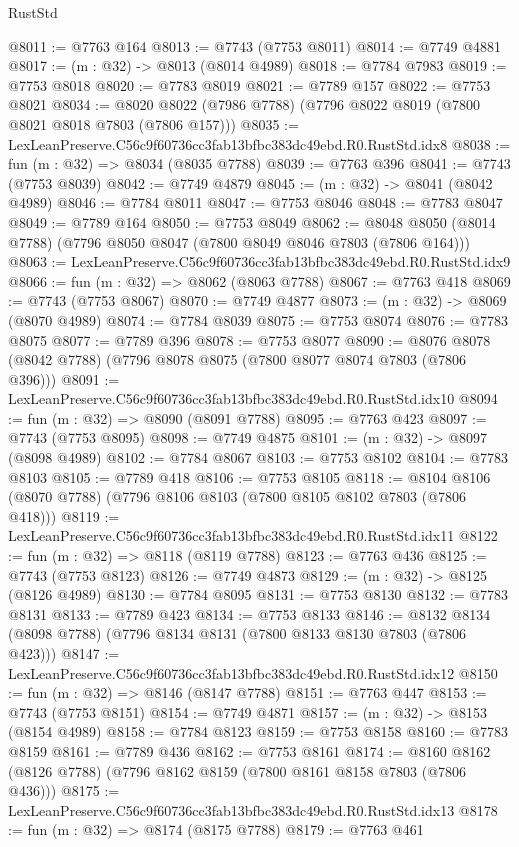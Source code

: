 \begin{lexlean}{RustStd}
\begin{coremodule}
@8011 := @7763 @164
@8013 := @7743 (@7753 @8011)
@8014 := @7749 @4881
@8017 := (m : @32) -> @8013 (@8014 @4989)
@8018 := @7784 @7983
@8019 := @7753 @8018
@8020 := @7783 @8019
@8021 := @7789 @157
@8022 := @7753 @8021
@8034 := @8020 @8022 (@7986 @7788) (@7796 @8022 @8019 (@7800 @8021 @8018 @7803 (@7806 @157)))
@8035 := LexLeanPreserve.C56c9f60736cc3fab13bfbc383dc49ebd.R0.RustStd.idx8
@8038 := fun (m : @32) => @8034 (@8035 @7788)
@8039 := @7763 @396
@8041 := @7743 (@7753 @8039)
@8042 := @7749 @4879
@8045 := (m : @32) -> @8041 (@8042 @4989)
@8046 := @7784 @8011
@8047 := @7753 @8046
@8048 := @7783 @8047
@8049 := @7789 @164
@8050 := @7753 @8049
@8062 := @8048 @8050 (@8014 @7788) (@7796 @8050 @8047 (@7800 @8049 @8046 @7803 (@7806 @164)))
@8063 := LexLeanPreserve.C56c9f60736cc3fab13bfbc383dc49ebd.R0.RustStd.idx9
@8066 := fun (m : @32) => @8062 (@8063 @7788)
@8067 := @7763 @418
@8069 := @7743 (@7753 @8067)
@8070 := @7749 @4877
@8073 := (m : @32) -> @8069 (@8070 @4989)
@8074 := @7784 @8039
@8075 := @7753 @8074
@8076 := @7783 @8075
@8077 := @7789 @396
@8078 := @7753 @8077
@8090 := @8076 @8078 (@8042 @7788) (@7796 @8078 @8075 (@7800 @8077 @8074 @7803 (@7806 @396)))
@8091 := LexLeanPreserve.C56c9f60736cc3fab13bfbc383dc49ebd.R0.RustStd.idx10
@8094 := fun (m : @32) => @8090 (@8091 @7788)
@8095 := @7763 @423
@8097 := @7743 (@7753 @8095)
@8098 := @7749 @4875
@8101 := (m : @32) -> @8097 (@8098 @4989)
@8102 := @7784 @8067
@8103 := @7753 @8102
@8104 := @7783 @8103
@8105 := @7789 @418
@8106 := @7753 @8105
@8118 := @8104 @8106 (@8070 @7788) (@7796 @8106 @8103 (@7800 @8105 @8102 @7803 (@7806 @418)))
@8119 := LexLeanPreserve.C56c9f60736cc3fab13bfbc383dc49ebd.R0.RustStd.idx11
@8122 := fun (m : @32) => @8118 (@8119 @7788)
@8123 := @7763 @436
@8125 := @7743 (@7753 @8123)
@8126 := @7749 @4873
@8129 := (m : @32) -> @8125 (@8126 @4989)
@8130 := @7784 @8095
@8131 := @7753 @8130
@8132 := @7783 @8131
@8133 := @7789 @423
@8134 := @7753 @8133
@8146 := @8132 @8134 (@8098 @7788) (@7796 @8134 @8131 (@7800 @8133 @8130 @7803 (@7806 @423)))
@8147 := LexLeanPreserve.C56c9f60736cc3fab13bfbc383dc49ebd.R0.RustStd.idx12
@8150 := fun (m : @32) => @8146 (@8147 @7788)
@8151 := @7763 @447
@8153 := @7743 (@7753 @8151)
@8154 := @7749 @4871
@8157 := (m : @32) -> @8153 (@8154 @4989)
@8158 := @7784 @8123
@8159 := @7753 @8158
@8160 := @7783 @8159
@8161 := @7789 @436
@8162 := @7753 @8161
@8174 := @8160 @8162 (@8126 @7788) (@7796 @8162 @8159 (@7800 @8161 @8158 @7803 (@7806 @436)))
@8175 := LexLeanPreserve.C56c9f60736cc3fab13bfbc383dc49ebd.R0.RustStd.idx13
@8178 := fun (m : @32) => @8174 (@8175 @7788)
@8179 := @7763 @461

\end{coremodule}
\end{lexlean}
